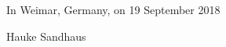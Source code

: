 \documentclass[oneside]{tutthesis} %
\begin{document}
\vspace{2\baselineskip}

In Weimar, Germany, on 19 September 2018

\vspace{2\baselineskip}

Hauke Sandhaus



\tableofcontents

\listoffigures























\end{document}
